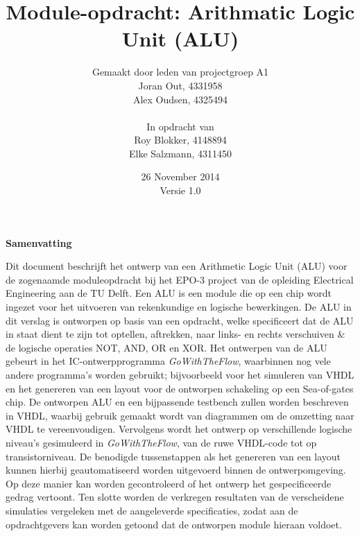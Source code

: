 \documentclass[11pt,twoside,a4paper]{article}
\title{Module-opdracht: Arithmatic Logic Unit (ALU)}
\author{
Gemaakt door leden van projectgroep A1\\
Joran Out, 4331958\\
Alex Oudsen, 4325494\\
\\
In opdracht van \\
Roy Blokker, 4148894\\
Elke Salzmann, 4311450\\
}
\date{26 November 2014\\Versie 1.0}
\begin{document}
\maketitle
\thispagestyle{empty}
\vspace{30 mm}
\begin{center}
\Large \bf 
Samenvatting
\end{center}
Dit document beschrijft het ontwerp van een Arithmetic Logic Unit (ALU) voor de zogenaamde moduleopdracht bij het EPO-3 project van de opleiding Electrical Engineering aan de TU Delft. Een ALU is een module die op een chip wordt ingezet voor het uitvoeren van rekenkundige en logische bewerkingen. De ALU in dit verslag is ontworpen op basis van een opdracht, welke specificeert dat de ALU in staat dient te zijn tot optellen, aftrekken, naar links- en rechts verschuiven \& de logische operaties NOT, AND, OR en XOR. Het ontwerpen van de ALU gebeurt in het IC-ontwerpprogramma \emph{GoWithTheFlow}, waarbinnen nog vele andere programma's worden gebruikt; bijvoorbeeld voor het simuleren van VHDL en het genereren van een layout voor de ontworpen schakeling op een Sea-of-gates chip. De ontworpen ALU en een bijpassende testbench zullen worden beschreven in VHDL, waarbij gebruik gemaakt wordt van diagrammen om de omzetting naar VHDL te vereenvoudigen. Vervolgens wordt het ontwerp op verschillende logische niveau's gesimuleerd in \emph{GoWithTheFlow}, van de ruwe VHDL-code tot op transistorniveau. De benodigde tussenstappen als het genereren van een layout  kunnen hierbij geautomatiseerd worden uitgevoerd binnen de ontwerpomgeving. Op deze manier kan worden gecontroleerd of het ontwerp het gespecificeerde gedrag vertoont. Ten slotte worden de verkregen resultaten van de verscheidene simulaties vergeleken met de aangeleverde specificaties, zodat aan de opdrachtgevers kan worden getoond dat de ontworpen module hieraan voldoet.
\clearpage

\tableofcontents
\clearpage
\end{document}
